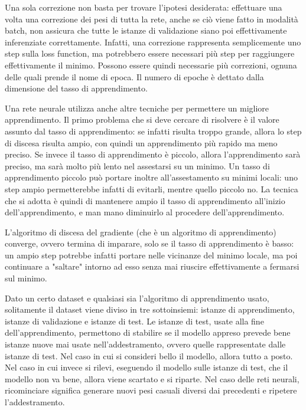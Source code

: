 Una sola correzione non basta per trovare l'ipotesi desiderata: effettuare una volta una correzione dei pesi di tutta la rete, anche se ciò viene fatto in modalità batch, non assicura che tutte le istanze di validazione siano poi effettivamente inferenziate correttamente.
Infatti, una correzione rappresenta semplicemente uno step sulla loss function, ma potrebbero essere necessari più step per raggiungere effettivamente il minimo.
Possono essere quindi necessarie più correzioni, ognuna delle quali prende il nome di epoca.
Il numero di epoche è dettato dalla dimensione del tasso di apprendimento.

Una rete neurale utilizza anche altre tecniche per permettere un migliore apprendimento.
Il primo problema che si deve cercare di risolvere è il valore assunto dal tasso di apprendimento: se infatti risulta troppo grande, allora lo step di discesa risulta ampio, con quindi un apprendimento più rapido ma meno preciso.
Se invece il tasso di apprendimento è piccolo, allora l'apprendimento sarà preciso, ma sarà molto più lento nel assestarsi su un minimo.
Un tasso di apprendimento piccolo può portare inoltre all'assestamento su minimi locali: uno step ampio permetterebbe infatti di evitarli, mentre quello piccolo no.
La tecnica che si adotta è quindi di mantenere ampio il tasso di apprendimento all'inizio dell'apprendimento, e man mano diminuirlo al procedere dell'apprendimento.

L'algoritmo di discesa del gradiente (che è un algoritmo di apprendimento) converge, ovvero termina di imparare, solo se il tasso di apprendimento è basso: un ampio step potrebbe infatti portare nelle vicinanze del minimo locale, ma poi continuare a "saltare" intorno ad esso senza mai riuscire effettivamente a fermarsi sul minimo.

Dato un certo dataset e qualsiasi sia l'algoritmo di apprendimento usato, solitamente il dataset viene diviso in tre sottoinsiemi: istanze di apprendimento, istanze di validazione e istanze di test.
Le istanze di test, usate alla fine dell'apprendimento, permettono di stabilire se il modello appreso prevede bene istanze nuove mai usate nell'addestramento, ovvero quelle rappresentate dalle istanze di test.
Nel caso in cui si consideri bello il modello, allora tutto a posto. Nel caso in cui invece si rilevi, eseguendo il modello sulle istanze di test, che il modello non va bene, allora viene scartato e si riparte.
Nel caso delle reti neurali, ricominciare significa generare nuovi pesi casuali diversi dai precedenti e ripetere l'addestramento.



